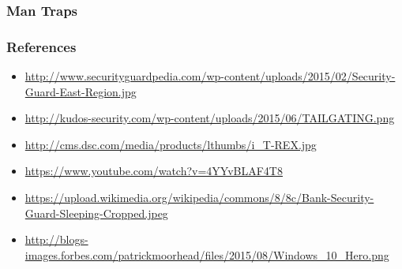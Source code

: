 \documentclass[]{beamer}
\begin{document}
\begin{frame}
  \frametitle{Man Traps}
\end{frame}

\begin{frame}
  \frametitle{References}
  \begin{itemize}
    \item \url{http://www.securityguardpedia.com/wp-content/uploads/2015/02/Security-Guard-East-Region.jpg}
    \item \url{http://kudos-security.com/wp-content/uploads/2015/06/TAILGATING.png}
    \item \url{http://cms.dsc.com/media/products/lthumbs/i_T-REX.jpg}
    \item \url{https://www.youtube.com/watch?v=4YYvBLAF4T8}
    \item \url{https://upload.wikimedia.org/wikipedia/commons/8/8c/Bank-Security-Guard-Sleeping-Cropped.jpeg}
    \item \url{http://blogs-images.forbes.com/patrickmoorhead/files/2015/08/Windows_10_Hero.png}
  \end{itemize}

\end{frame}
\end{document}
